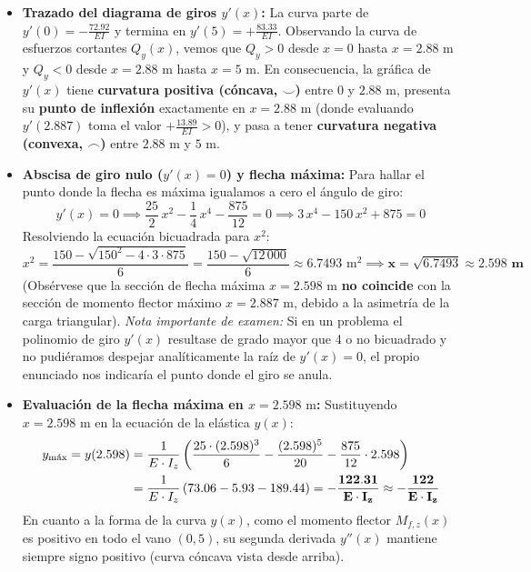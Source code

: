 {    \begin{itemize}
        \item \textbf{Trazado del diagrama de giros $y'(x)$:} La curva parte de $y'(0) = -\frac{72.92}{EI}$ y termina en $y'(5) = +\frac{83.33}{EI}$. Observando la curva de esfuerzos cortantes $Q_y(x)$, vemos que $Q_y > 0$ desde $x = 0$ hasta $x = 2.88\text{ m}$ y $Q_y < 0$ desde $x = 2.88\text{ m}$ hasta $x = 5\text{ m}$. En consecuencia, la gráfica de $y'(x)$ tiene \textbf{curvatura positiva (cóncava, $\smile$)} entre $0$ y $2.88\text{ m}$, presenta su \textbf{punto de inflexión} exactamente en $x = 2.88\text{ m}$ (donde evaluando $y'(2.887)$ toma el valor $+\frac{13.89}{EI} > 0$), y pasa a tener \textbf{curvatura negativa (convexa, $\frown$)} entre $2.88\text{ m}$ y $5\text{ m}$.
        \item \textbf{Abscisa de giro nulo ($y'(x) = 0$) y flecha máxima:} Para hallar el punto donde la flecha es máxima igualamos a cero el ángulo de giro:
              \begin{equation}
                  y'(x) = 0 \implies \frac{25}{2}\,x^2 - \frac{1}{4}\,x^4 - \frac{875}{12} = 0 \implies 3\,x^4 - 150\,x^2 + 875 = 0
              \end{equation}
              Resolviendo la ecuación bicuadrada para $x^2$:
              \begin{equation}
                  x^2 = \frac{150 - \sqrt{150^2 - 4 \cdot 3 \cdot 875}}{6} = \frac{150 - \sqrt{12\,000}}{6} \approx 6.7493\text{ m}^2 \implies \mathbf{x = \sqrt{6.7493} \approx 2.598\text{ m}}
              \end{equation}
              (Obsérvese que la sección de flecha máxima $x = 2.598\text{ m}$ \textbf{no coincide} con la sección de momento flector máximo $x = 2.887\text{ m}$, debido a la asimetría de la carga triangular).
              \textit{Nota importante de examen:} Si en un problema el polinomio de giro $y'(x)$ resultase de grado mayor que 4 o no bicuadrado y no pudiéramos despejar analíticamente la raíz de $y'(x) = 0$, el propio enunciado nos indicaría el punto donde el giro se anula.
        \item \textbf{Evaluación de la flecha máxima en $x = 2.598\text{ m}$:}
              Sustituyendo $x = 2.598\text{ m}$ en la ecuación de la elástica $y(x)$:
              \begin{align}
                  y_{\text{máx}} = y(2.598) & = \frac{1}{E \cdot I_z} \left( \frac{25 \cdot (2.598)^3}{6} - \frac{(2.598)^5}{20} - \frac{875}{12} \cdot 2.598 \right) \notag \\
                                            & = \frac{1}{E \cdot I_z} \left( 73.06 - 5.93 - 189.44 \right) = \mathbf{-\frac{122.31}{E \cdot I_z} \approx -\frac{122}{E \cdot I_z}}
              \end{align}
              En cuanto a la forma de la curva $y(x)$, como el momento flector $M_{f,z}(x)$ es positivo en todo el vano $(0, 5)$, su segunda derivada $y''(x)$ mantiene siempre signo positivo (curva cóncava vista desde arriba).
    \end{itemize}

}
